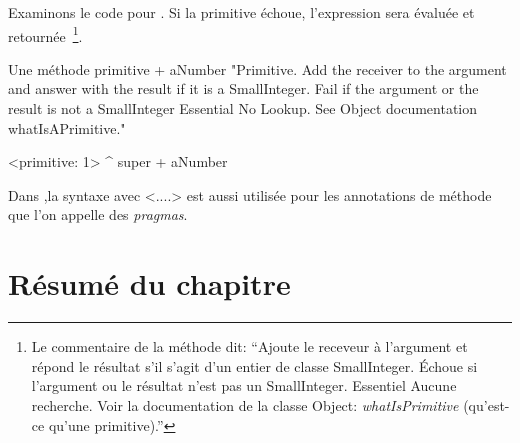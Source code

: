 \documentclass[a4paper,10pt,twoside]{book}
\begin{document}
Examinons le code pour .
Si la primitive échoue, l'expression  sera
évaluée et retournée~\footnote{Le commentaire de la
  méthode dit: ``Ajoute le receveur à l'argument et répond le
  résultat s'il s'agit d'un entier de classe SmallInteger. Échoue
  si l'argument ou le résultat n'est pas un
  SmallInteger. Essentiel Aucune recherche. Voir la documentation de
  la classe Object: \emph{whatIsPrimitive} (qu'est-ce qu'une primitive).''}.

\begin{method}[primitive]{Une méthode primitive}
+ aNumber 
  "Primitive. Add the receiver to the argument and answer with the result
  if it is a SmallInteger. Fail if the argument or the result is not a
  SmallInteger  Essential  No Lookup. See Object documentation whatIsAPrimitive."

  <primitive: 1>
  ^ super + aNumber
\end{method}





Dans \pharo,la syntaxe avec <....> est aussi utilisée
pour les annotations de méthode que l'on appelle des
\emph{pragmas}. %


\section{Résumé du chapitre}
\end{document}
